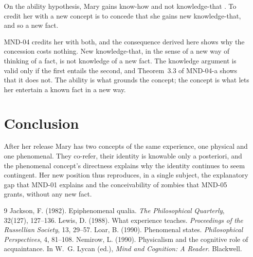 \documentclass{situationist-preprint}
\begin{document}
\begin{objection}
On the ability hypothesis, Mary gains know-how and not knowledge-that \citep{Lewis1988,Nemirow1990}. To credit her with a new concept is to concede that she gains new knowledge-that, and so a new fact.
\end{objection}

\begin{reply}
MND-04 credits her with both, and the consequence derived here shows why the concession costs nothing. New knowledge-that, in the sense of a new way of thinking of a fact, is not knowledge of a new fact. The knowledge argument \citep{Jackson1982} is valid only if the first entails the second, and Theorem~3.3 of MND-04-a shows that it does not. The ability is what grounds the concept; the concept is what lets her entertain a known fact in a new way.
\end{reply}

\section{Conclusion}

After her release Mary has two concepts of the same experience, one physical and one phenomenal. They co-refer, their identity is knowable only a posteriori, and the phenomenal concept's directness explains why the identity continues to seem contingent. Her new position thus reproduces, in a single subject, the explanatory gap that MND-01 explains and the conceivability of zombies that MND-05 grants, without any new fact.

\begin{thebibliography}{9}\small
{} Jackson, F. (1982). Epiphenomenal qualia. \emph{The Philosophical Quarterly}, 32(127), 127--136.
 Lewis, D. (1988). What experience teaches. \emph{Proceedings of the Russellian Society}, 13, 29--57.
 Loar, B. (1990). Phenomenal states. \emph{Philosophical Perspectives}, 4, 81--108.
 Nemirow, L. (1990). Physicalism and the cognitive role of acquaintance. In W.~G. Lycan (ed.), \emph{Mind and Cognition: A Reader}. Blackwell.
\end{thebibliography}
\end{document}
